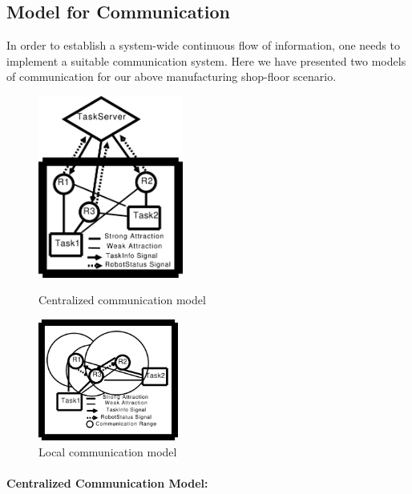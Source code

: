 \documentclass{llncs}
\begin{document}
\subsection{Model for Communication}
In order to establish a system-wide continuous flow of information, one needs to implement a  suitable communication system. Here we have presented two models of communication for our above manufacturing shop-floor scenario.
%
\begin{figure}[ht]
\begin{minipage}[b]{0.55\linewidth}
\centering
\includegraphics[height=6cm, angle=0]{../dia-files/CentralizedComm.eps}
\caption{Centralized communication model}
\label{fig:ccm} %
\end{minipage}
\begin{minipage}[b]{0.45\linewidth}
\centering
\includegraphics[height=4cm, angle=0]{../dia-files/LocalComm.eps}
\caption{Local communication model}
\label{fig:lcm} %
\end{minipage}
\end{figure}
%
\paragraph{Centralized Communication Model:}
\end{document}

